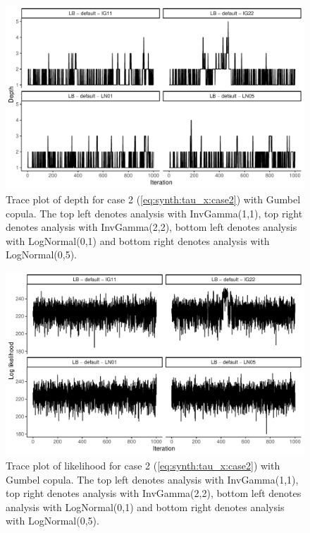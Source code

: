 \documentclass{amsart}
\begin{document}
\begin{figure}
	\centering
	\includegraphics[width = 0.75\linewidth]{trace_case2_gumbel_depth.pdf}
	\caption{Trace plot of depth for case 2 (\cref{eq:synth:tau_x:case2}) with Gumbel copula. The top left denotes analysis with InvGamma(1,1), top right denotes analysis with InvGamma(2,2), bottom left denotes analysis with LogNormal(0,1) and bottom right denotes analysis with LogNormal(0,5).}
	\label{fig:case2:gumbel:depth}
\end{figure}

\begin{figure}
	\centering
	\includegraphics[width = 0.75\linewidth]{trace_case2_gumbel_like.pdf}
	\caption{Trace plot of likelihood for case 2 (\cref{eq:synth:tau_x:case2}) with Gumbel copula. The top left denotes analysis with InvGamma(1,1), top right denotes analysis with InvGamma(2,2), bottom left denotes analysis with LogNormal(0,1) and bottom right denotes analysis with LogNormal(0,5).}
	\label{fig:case2:gumbel:like}
\end{figure}
\end{document}
